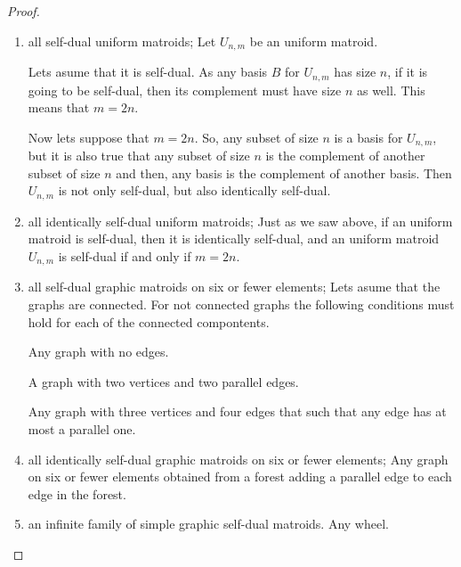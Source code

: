 \begin{proof}$\,$\pn
    \begin{enumerate}[label=(\roman*)]
        \item all self-dual uniform matroids;
            Let $U_{n,m}$ be an uniform matroid.\pn
            
            Lets asume that it is self-dual. As
            any basis $B$ for $U_{n,m}$ has size $n$, if it is going to be self-dual,
            then its complement must have size $n$ as well. This means that $m = 2n$.\pn
            
            Now lets suppose that $m = 2n$. So, any subset of size $n$ is a basis for $U_{n,m}$,
            but it is also true that any subset of size $n$ is the complement of another subset
            of size $n$ and then, any basis is the complement of another basis. Then $U_{n,m}$ is
            not only self-dual, but also identically self-dual.
        \item all identically self-dual uniform matroids;
            Just as we saw above, if an uniform matroid is self-dual, then it is identically self-dual, and
            an uniform matroid $U_{n,m}$ is self-dual if and only if $m = 2n$.
        \item all self-dual graphic matroids on six or fewer elements;
            Lets asume that the graphs are connected. For not connected graphs the following conditions
            must hold for each of the connected compontents.\pn
            
            Any graph with no edges.\pn
            
            A graph with two vertices and two parallel edges.\pn
            
            Any graph with three vertices and four edges that such that any edge has at most
            a parallel one.\pn
            
            
        \item all identically self-dual graphic matroids on six or fewer elements;
            Any graph on six or fewer elements obtained from a forest adding a parallel edge to each edge in the forest.
            
        \item an infinite family of simple graphic self-dual matroids.
            Any wheel.
    \end{enumerate}
\end{proof}